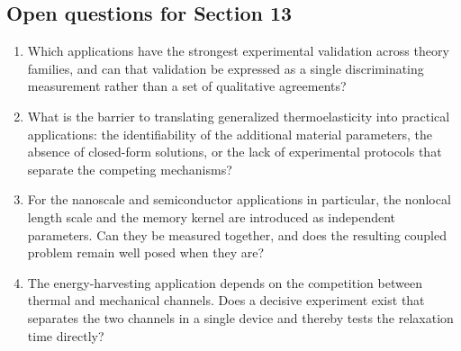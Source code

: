 \subsection{Open questions for Section 13}

\begin{enumerate}[label=\textbf{OQ13.\arabic*}]
\item Which applications have the strongest experimental validation across theory families, and can that validation be expressed as a single discriminating measurement rather than a set of qualitative agreements? \label{oq:13.1}
\item What is the barrier to translating generalized thermoelasticity into practical applications: the identifiability of the additional material parameters, the absence of closed-form solutions, or the lack of experimental protocols that separate the competing mechanisms? \label{oq:13.2}
\item For the nanoscale and semiconductor applications in particular, the nonlocal length scale and the memory kernel are introduced as independent parameters. Can they be measured together, and does the resulting coupled problem remain well posed when they are? \label{oq:13.3}
\item The energy-harvesting application depends on the competition between thermal and mechanical channels. Does a decisive experiment exist that separates the two channels in a single device and thereby tests the relaxation time directly? \label{oq:13.4}
\end{enumerate}

